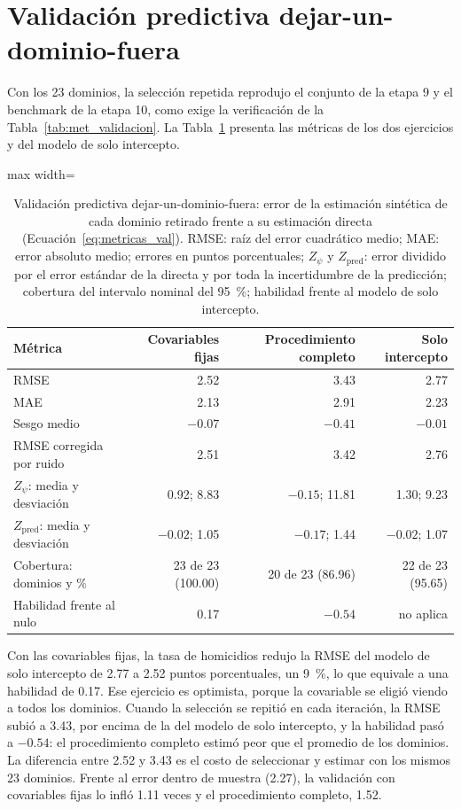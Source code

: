 \section{Validación predictiva dejar-un-dominio-fuera}
\label{sec:res_validacion}

Con los 23 dominios, la selección repetida reprodujo el conjunto de la etapa 9 y el benchmark de la etapa 10, como exige la verificación de la Tabla~\ref{tab:met_validacion}. La Tabla~\ref{tab:res_validacion} presenta las métricas de los dos ejercicios y del modelo de solo intercepto.

\begin{table}[!htbp]
\centering
\small
\caption{Validación predictiva dejar-un-dominio-fuera: error de la estimación sintética de cada dominio retirado frente a su estimación directa (Ecuación~\ref{eq:metricas_val}). RMSE: raíz del error cuadrático medio; MAE: error absoluto medio; errores en puntos porcentuales; $Z_{\psi}$ y $Z_{\text{pred}}$: error dividido por el error estándar de la directa y por toda la incertidumbre de la predicción; cobertura del intervalo nominal del 95~\%; habilidad frente al modelo de solo intercepto.}
\label{tab:res_validacion}
\begin{adjustbox}{max width=\linewidth}
\begin{tabular}{l r r r}
\toprule
Métrica & Covariables fijas & Procedimiento completo & Solo intercepto \\
\midrule
RMSE & 2.52 & 3.43 & 2.77 \\
MAE & 2.13 & 2.91 & 2.23 \\
Sesgo medio & $-0.07$ & $-0.41$ & $-0.01$ \\
RMSE corregida por ruido & 2.51 & 3.42 & 2.76 \\
$Z_{\psi}$: media y desviación & 0.92; 8.83 & $-0.15$; 11.81 & 1.30; 9.23 \\
$Z_{\text{pred}}$: media y desviación & $-0.02$; 1.05 & $-0.17$; 1.44 & $-0.02$; 1.07 \\
Cobertura: dominios y \% & 23 de 23 (100.00) & 20 de 23 (86.96) & 22 de 23 (95.65) \\
Habilidad frente al nulo & 0.17 & $-0.54$ & no aplica \\
\bottomrule
\end{tabular}
\end{adjustbox}
\end{table}

Con las covariables fijas, la tasa de homicidios redujo la RMSE del modelo de solo intercepto de 2.77 a 2.52 puntos porcentuales, un 9~\%, lo que equivale a una habilidad de 0.17. Ese ejercicio es optimista, porque la covariable se eligió viendo a todos los dominios. Cuando la selección se repitió en cada iteración, la RMSE subió a 3.43, por encima de la del modelo de solo intercepto, y la habilidad pasó a $-0.54$: el procedimiento completo estimó peor que el promedio de los dominios. La diferencia entre 2.52 y 3.43 es el costo de seleccionar y estimar con los mismos 23 dominios. Frente al error dentro de muestra (2.27), la validación con covariables fijas lo infló 1.11 veces y el procedimiento completo, 1.52.

